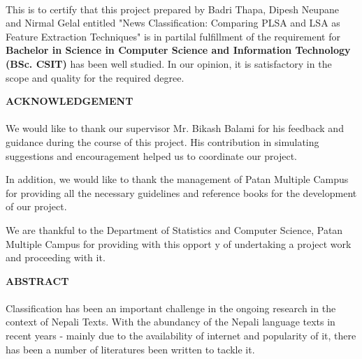 \documentclass[12pt]{report}
\begin{document}
\paragraph{}
This is to certify that this project prepared by Badri Thapa, Dipesh Neupane and Nirmal Gelal entitled "News Classification: Comparing PLSA and LSA as Feature Extraction Techniques"
        is in partilal fulfillment of the requirement for \textbf{Bachelor in Science in Computer Science and Information Technology (BSc. CSIT)} has been well studied. In our opinion, it is satisfactory in the scope and quality for the required degree.
        



    \newpage

    \begin{center}
        \textbf{ACKNOWLEDGEMENT}


    \end{center}
    \paragraph{}
        We would like to thank our supervisor Mr. Bikash Balami for his feedback and guidance during the course of this project.
        His contribution in simulating suggestions and encouragement helped us to coordinate our project.

        In addition, we would like to thank the management of Patan Multiple Campus for providing all the necessary guidelines and reference books for the development of 
        our project. 

        We are thankful to the Department of Statistics and Computer Science, Patan Multiple Campus for providing with this opport y of undertaking a project work and 
        proceeding with it.

    





    \newpage

 \begin{center}
        \textbf{ABSTRACT}
        

    \end{center}
    \paragraph{}
        Classification has been an important challenge in the ongoing research in the context of Nepali Texts.
        With the abundancy of the Nepali language texts in recent years - mainly due to the availability of internet and 
        popularity of it, there has been a number of literatures been written to tackle it. 
\end{document}
